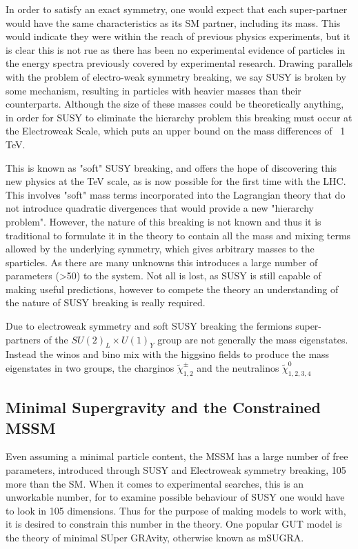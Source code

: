 In order to satisfy an exact symmetry, one would expect that each super-partner would have the same characteristics as its SM partner, including its mass. This would indicate they were within the reach of previous physics experiments, but it is clear this is not rue as there has been no experimental evidence of particles in the energy spectra previously covered by experimental research. Drawing parallels with the problem of electro-weak symmetry breaking, we say SUSY is broken by some mechanism, resulting in particles with heavier masses than their counterparts. Although the size of these masses could be theoretically anything, in order for SUSY to eliminate the hierarchy problem this breaking must occur at the Electroweak Scale, which puts an upper bound on the mass differences of ~1 TeV.  

This is known as "soft" SUSY breaking, and offers the hope of discovering this new physics at the TeV scale, as is now possible for the first time with the LHC. This involves "soft" mass terms incorporated into the Lagrangian theory that do not introduce quadratic divergences that would provide a new "hierarchy problem". However, the nature of this breaking is not known and thus it is traditional to formulate it in the theory to contain all the mass and mixing terms allowed by the underlying symmetry, which gives arbitrary masses to the sparticles. As there are many unknowns this introduces a large number of parameters (>50) to the system. Not all is lost, as SUSY is still capable of making useful predictions, however to compete the theory an understanding of the nature of SUSY breaking is really required. 

Due to electroweak symmetry and soft SUSY breaking the fermions super-partners of the $SU(2)_{L} \times U(1)_{Y}$ group are not generally the mass eigenstates. Instead the winos and bino mix with the higgsino fields to produce the mass eigenstates in two groups, the charginos $\tilde{\chi}^{\pm}_{1,2}$ and the neutralinos $\tilde{\chi}^{0}_{1,2,3,4}$


\subsection{Minimal Supergravity and the Constrained MSSM}

Even assuming a minimal particle content, the MSSM has a large number of free parameters, introduced through SUSY and Electroweak symmetry breaking, 105 more than the SM. When it comes to experimental searches, this is an unworkable number, for to examine possible behaviour of SUSY one would have to look in 105 dimensions. Thus for the purpose of making models to work with, it is desired to constrain this number in the theory. One popular GUT model is the theory of minimal SUper GRAvity, otherwise known as mSUGRA. 

